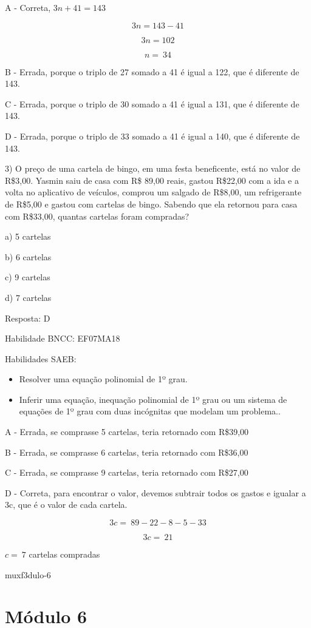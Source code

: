 {A - Correta, \(3n + 41 = 143\)

\[3n = 143 - 41\]

\[3n = 102\]

\[n = \ 34\]

B - Errada, porque o triplo de 27 somado a 41 é igual a 122, que é
diferente de 143.

C - Errada, porque o triplo de 30 somado a 41 é igual a 131, que é
diferente de 143.

D - Errada, porque o triplo de 33 somado a 41 é igual a 140, que é
diferente de 143.

3) O preço de uma cartela de bingo, em uma festa beneficente, está no
valor de R\$3,00. Yasmin saiu de casa com R\$ 89,00 reais, gastou
R\$22,00 com a ida e a volta no aplicativo de veículos, comprou um
salgado de R\$8,00, um refrigerante de R\$5,00 e gastou com cartelas de
bingo. Sabendo que ela retornou para casa com R\$33,00, quantas cartelas
foram compradas?

a) 5 cartelas

b) 6 cartelas

c) 9 cartelas

d) 7 cartelas

Resposta: D

Habilidade BNCC: EF07MA18

Habilidades SAEB:

\begin{itemize}
\item
  Resolver uma equação polinomial de 1º grau.
\item
  Inferir uma equação, inequação polinomial de 1º grau ou um sistema de
  equações de 1º grau com duas incógnitas que modelam um problema..
\end{itemize}

A - Errada, se comprasse 5 cartelas, teria retornado com R\$39,00

B - Errada, se comprasse 6 cartelas, teria retornado com R\$36,00

C - Errada, se comprasse 9 cartelas, teria retornado com R\$27,00

D - Correta, para encontrar o valor, devemos subtrair todos os gastos e
igualar a 3c, que é o valor de cada cartela.

\[3c = \ 89 - 22 - 8 - 5 - 33\]

\[3c = \ 21\]

\(c = \ 7\) cartelas compradas

muxf3dulo-6}{%
\section{Módulo 6}

}

